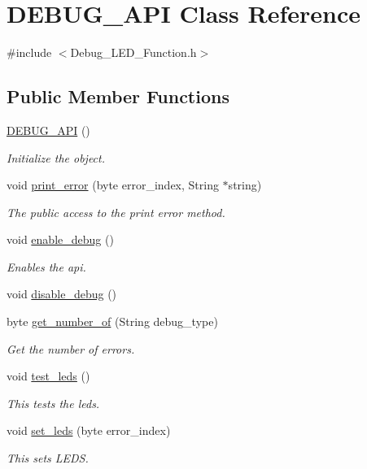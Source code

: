 \hypertarget{class_d_e_b_u_g___a_p_i}{\section{D\-E\-B\-U\-G\-\_\-\-A\-P\-I Class Reference}
\label{class_d_e_b_u_g___a_p_i}
}


{\ttfamily \#include $<$Debug\-\_\-\-L\-E\-D\-\_\-\-Function.\-h$>$}

\subsection*{Public Member Functions}
\begin{DoxyCompactItemize}
\item 
\hyperlink{class_d_e_b_u_g___a_p_i_a573c4ebcc96632fb12aad036f68a231a}{D\-E\-B\-U\-G\-\_\-\-A\-P\-I} ()
\begin{DoxyCompactList}\small\item\em Initialize the object. \end{DoxyCompactList}\item 
void \hyperlink{class_d_e_b_u_g___a_p_i_a2084d878afdde093bd95a749282590a1}{print\-\_\-error} (byte error\-\_\-index, String $\ast$string)
\begin{DoxyCompactList}\small\item\em The public access to the print error method. \end{DoxyCompactList}\item 
void \hyperlink{class_d_e_b_u_g___a_p_i_a2c910c342cebdbd81a5f8e0f9de24a94}{enable\-\_\-debug} ()
\begin{DoxyCompactList}\small\item\em Enables the api. \end{DoxyCompactList}\item 
void \hyperlink{class_d_e_b_u_g___a_p_i_ab0c679d0b716b4ef99618e32267b8a2b}{disable\-\_\-debug} ()
\item 
byte \hyperlink{class_d_e_b_u_g___a_p_i_afd130564d124997675161bbe1ee16245}{get\-\_\-number\-\_\-of} (String debug\-\_\-type)
\begin{DoxyCompactList}\small\item\em Get the number of errors. \end{DoxyCompactList}\item 
void \hyperlink{class_d_e_b_u_g___a_p_i_a0abf9ea9d411c7191ed85a03ebdc2a3b}{test\-\_\-leds} ()
\begin{DoxyCompactList}\small\item\em This tests the leds. \end{DoxyCompactList}\item 
void \hyperlink{class_d_e_b_u_g___a_p_i_a320010e820438f41eb7e91e406c15698}{set\-\_\-leds} (byte error\-\_\-index)
\begin{DoxyCompactList}\small\item\em This sets L\-E\-D\-S. \end{DoxyCompactList}\end{DoxyCompactItemize}


